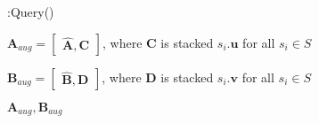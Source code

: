 \begin{algorithm}[t]
    \caption{\oursolution:Query()}
    \label{alg:query-normalized}
    \DontPrintSemicolon

    $\boldsymbol{A}_{aug} = 
    \begin{bmatrix}
     \hat{\boldsymbol{A}},\boldsymbol{C}   
    \end{bmatrix}$, where $\boldsymbol{C}$ is stacked $s_i.\boldsymbol{u}$ for all $s_i \in S$
    
    $\boldsymbol{B}_{aug} = 
    \begin{bmatrix}
     \hat{\boldsymbol{B}},\boldsymbol{D}   
    \end{bmatrix}$, where $\boldsymbol{D}$ is stacked $s_i.\boldsymbol{v}$ for all $s_i \in S$

    \Return $\boldsymbol{A}_{aug}, \boldsymbol{B}_{aug}$
    
\end{algorithm}